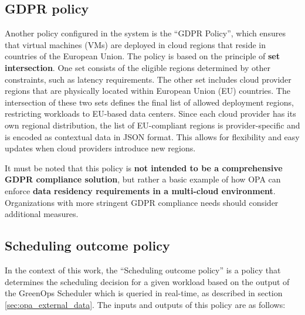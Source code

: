 \subsection{GDPR policy}

Another policy configured in the system is the ``GDPR Policy'', which ensures that virtual machines (VMs) are deployed in cloud regions that reside in countries of the European Union. 
The policy is based on the principle of \textbf{set intersection}. One set consists of the eligible regions determined by other constraints, such as latency requirements. The other set includes cloud provider regions that are physically located within European Union (EU) countries.
The intersection of these two sets defines the final list of allowed deployment regions, restricting workloads to EU-based data centers.
Since each cloud provider has its own regional distribution, the list of EU-compliant regions is provider-specific and is encoded as contextual data in JSON format. This allows for flexibility and easy updates when cloud providers introduce new regions.

It must be noted that this policy is \textbf{not intended to be a comprehensive GDPR compliance solution}, but rather a basic example of how OPA can enforce \textbf{data residency requirements in a multi-cloud environment}. Organizations with more stringent GDPR compliance needs should consider additional measures.

\subsection{Scheduling outcome policy}
\label{sec:scheduling_outcome_policy}

In the context of this work, the ``Scheduling outcome policy'' is a policy that determines the scheduling decision for a given workload based on the output of the GreenOps Scheduler which is queried in real-time, as described in section \ref{sec:opa_external_data}.
The inputs and outputs of this policy are as follows:

